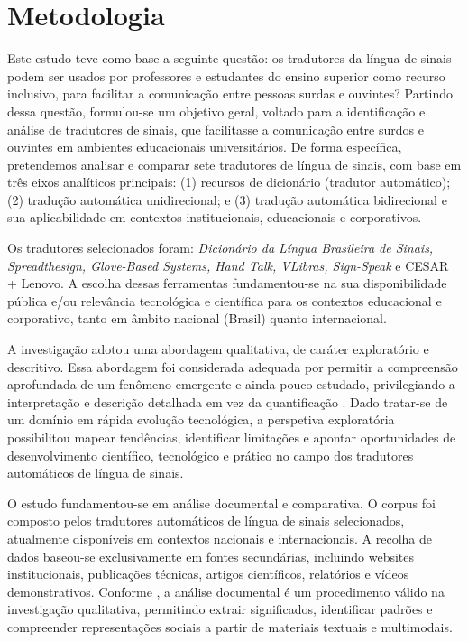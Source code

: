 \documentclass[portuguese]{textolivre}
\begin{document}
\section{Metodologia}
Este estudo teve como base a seguinte questão: os tradutores da língua de sinais podem ser usados por professores e estudantes do ensino superior como recurso inclusivo, para facilitar a comunicação entre pessoas surdas e ouvintes? Partindo dessa questão, formulou-se um objetivo geral, voltado para a identificação e análise de tradutores de sinais, que facilitasse a comunicação entre surdos e ouvintes em ambientes educacionais universitários. De forma específica, pretendemos analisar e comparar sete tradutores de língua de sinais, com base em três eixos analíticos principais: (1) recursos de dicionário (tradutor automático); (2) tradução automática unidirecional; e (3) tradução automática bidirecional e sua aplicabilidade em contextos institucionais, educacionais e corporativos.

Os tradutores selecionados foram: \textit{Dicionário da Língua Brasileira de Sinais, Spreadthesign, Glove-Based Systems, Hand Talk, VLibras, Sign-Speak} e CESAR + Lenovo. A escolha dessas ferramentas fundamentou-se na sua disponibilidade pública e/ou relevância tecnológica e científica para os contextos educacional e corporativo, tanto em âmbito nacional (Brasil) quanto internacional.

A investigação adotou uma abordagem qualitativa, de caráter exploratório e descritivo. Essa abordagem foi considerada adequada por permitir a compreensão aprofundada de um fenômeno emergente e ainda pouco estudado, privilegiando a interpretação e descrição detalhada em vez da quantificação \cite{CreswellPoth2018}. Dado tratar-se de um domínio em rápida evolução tecnológica, a perspetiva exploratória possibilitou mapear tendências, identificar limitações e apontar oportunidades de desenvolvimento científico, tecnológico e prático no campo dos tradutores automáticos de língua de sinais.

O estudo fundamentou-se em análise documental e comparativa. O corpus foi composto pelos tradutores automáticos de língua de sinais selecionados, atualmente disponíveis em contextos nacionais e internacionais. A recolha de dados baseou-se exclusivamente em fontes secundárias, incluindo websites institucionais, publicações técnicas, artigos científicos, relatórios e vídeos demonstrativos. Conforme \textcite{Bowen2009}, a análise documental é um procedimento válido na investigação qualitativa, permitindo extrair significados, identificar padrões e compreender representações sociais a partir de materiais textuais e multimodais.
\end{document}
